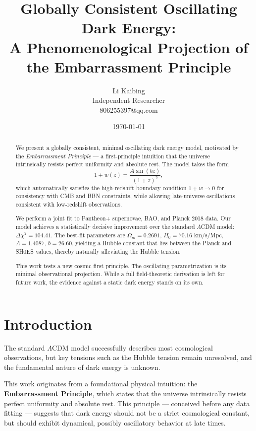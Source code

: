 \documentclass[10pt,twocolumn]{article}
\begin{document}
\title{
Globally Consistent Oscillating Dark Energy: \\
A Phenomenological Projection of the Embarrassment Principle
}

\author{Li Kaibing \\
Independent Researcher \\
806255397@qq.com}

\date{\today}

\maketitle

\begin{abstract}
We present a globally consistent, minimal oscillating dark energy model,
motivated by the \emph{Embarrassment Principle} — a first-principle intuition
that the universe intrinsically resists perfect uniformity and absolute rest.
The model takes the form
\[
1+w(z) = \frac{A\sin(bz)}{(1+z)^2},
\]
which automatically satisfies the high-redshift boundary condition $1+w\to0$
for consistency with CMB and BBN constraints, while allowing
late-universe oscillations consistent with low-redshift observations.

We perform a joint fit to Pantheon+ supernovae, BAO, and Planck 2018 data.
Our model achieves a statistically decisive improvement over the standard
$\Lambda$CDM model: $\Delta\chi^2=104.41$. The best-fit parameters are
$\Omega_m=0.2691$, $H_0=70.16$ km/s/Mpc, $A=1.4087$, $b=26.60$,
yielding a Hubble constant that lies between the Planck and SH0ES values,
thereby naturally alleviating the Hubble tension.

This work tests a new cosmic first principle. The oscillating parametrization is its minimal observational projection.
While a full field-theoretic derivation is left for future work, the evidence against a static dark energy stands on its own.
\end{abstract}

\section{Introduction}
The standard $\Lambda$CDM model successfully describes most cosmological
observations, but key tensions such as the Hubble tension remain unresolved,
and the fundamental nature of dark energy is unknown.

This work originates from a foundational physical intuition:
the \textbf{Embarrassment Principle}, which states that the universe
intrinsically resists perfect uniformity and absolute rest.
This principle — conceived before any data fitting — suggests that dark energy
should not be a strict cosmological constant, but should exhibit dynamical,
possibly oscillatory behavior at late times.
\end{document}
